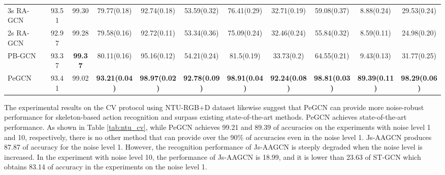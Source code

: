 \documentclass[runningheads]{llncs}
\begin{document}
\begin{table*}[t]
{\begin{tabular}{l c c c c c c c c c c}
		\multicolumn{1}{l}{3s RA-GCN \cite{song2019richly}} & 93.51&99.30& 79.77(0.18)&	92.74(0.18)&	53.59(0.32)&	76.41(0.29)&	32.71(0.19)&	59.08(0.37)&	8.88(0.24)&	29.53(0.24) \\
		
		\multicolumn{1}{l}{2s RA-GCN \cite{song2019richly}} & 92.97 & 99.28 & 79.58(0.16)&	92.72(0.11)&	53.34(0.36)&	75.09(0.24)&	32.46(0.24)&	55.84(0.32)&	8.59(0.11)&	24.98(0.20) \\
		
		

        \multicolumn{1}{l}{PB-GCN \cite{thakkar2018part}} & 93.37 &	\textbf{99.37} & 80.11(0.16)&	95.16(0.12)&	54.21(0.24)&	81.5(0.19)&33.73(0.2)&	64.55(0.21)&	9.43(0.13)&	31.77(0.25) \\


	    \hline
		\multicolumn{1}{l}{PeGCN} &
		93.41 &	99.02 & \textbf{93.21(0.04)}&	\textbf{98.97(0.02)}&	\textbf{92.78(0.09)}&	\textbf{98.91(0.04)}&	\textbf{92.24(0.08)}&	\textbf{98.81(0.03)}&	\textbf{89.39(0.11)}&	\textbf{98.29(0.06) }\\
		\midrule
		\bottomrule
	\end{tabular}
}
	\caption{Recognition accuracies depending on the noise level using the CV protocol of NTU-RGB+D dataset.  indicates that the method were trained and tested by ourselves. The boldface figures denote the highest performance for each experiment.}
	\label{tab:ntu_cv}
	\vspace{-6ex}
\end{table*}

The experimental results on the CV protocol using NTU-RGB+D dataset likewise suggest that PeGCN can provide more noise-robust performance for skeleton-based action recognition and surpass existing state-of-the-art methods. PeGCN achieves state-of-the-art performance. As shown in Table \ref{tab:ntu_cv}, while PeGCN achieves 99.21 and 89.39 of accuracies on the experiments with noise level 1 and 10, respectively, there is no other method that can provide over the 90\% of accuracies even in the noise level 1. Js-AAGCN \cite{shi2019multi} produces 87.87 of accuracy for the noise level 1. However, the recognition performance of Js-AAGCN is steeply degraded when the noise level is increased. In the experiment with noise level 10, the performance of Js-AAGCN is 18.99, and it is lower than 23.63 of ST-GCN \cite{yan2018spatial} which obtains 83.14 of accuracy in the experiments on the noise level 1. 
\end{document}
